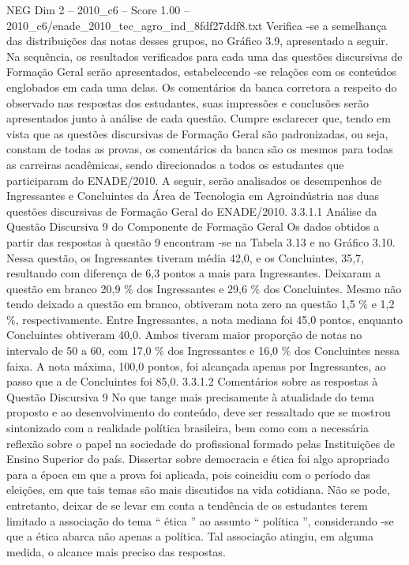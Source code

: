 \begin{textsample}{NEG Dim 2 – 2010\_c6 – Score 1.00 – 2010\_c6/enade\_2010\_tec\_agro\_ind\_8fdf27ddf8.txt}
Verifica -se a semelhança das distribuições das notas desses grupos, no Gráfico 3.9, apresentado a seguir.
Na sequência, os resultados verificados para cada uma das questões discursivas de Formação Geral serão apresentados, estabelecendo -se relações com os conteúdos englobados em cada uma delas.
Os comentários da banca corretora a respeito do observado nas respostas dos estudantes, suas impressões e conclusões serão apresentados junto à análise de cada questão.
Cumpre esclarecer que, tendo em vista que as questões discursivas de Formação Geral são padronizadas, ou seja, constam de todas as provas, os comentários da banca são os mesmos para todas as carreiras acadêmicas, sendo direcionados a todos os estudantes que participaram do ENADE/2010.
A seguir, serão analisados os desempenhos de Ingressantes e Concluintes da Área de Tecnologia em Agroindústria nas duas questões discursivas de Formação Geral do ENADE/2010. 3.3.1.1 Análise da Questão Discursiva 9 do Componente de Formação Geral Os dados obtidos a partir das respostas à questão 9 encontram -se na Tabela 3.13 e no Gráfico 3.10.
Nessa questão, os Ingressantes tiveram média 42,0, e os Concluintes, 35,7, resultando com diferença de 6,3 pontos a mais para Ingressantes.
Deixaram a questão em branco 20,9 \% dos Ingressantes e 29,6 \% dos Concluintes.
Mesmo não tendo deixado a questão em branco, obtiveram nota zero na questão 1,5 \% e 1,2 \%, respectivamente.
Entre Ingressantes, a nota mediana foi 45,0 pontos, enquanto Concluintes obtiveram 40,0.
Ambos tiveram maior proporção de notas no intervalo de 50 a 60, com 17,0 \% dos Ingressantes e 16,0 \% dos Concluintes nessa faixa.
A nota máxima, 100,0 pontos, foi alcançada apenas por Ingressantes, ao passo que a de Concluintes foi 85,0. 3.3.1.2 Comentários sobre as respostas à Questão Discursiva 9 No que tange mais precisamente à atualidade do tema proposto e ao desenvolvimento do conteúdo, deve ser ressaltado que se mostrou sintonizado com a realidade política brasileira, bem como com a necessária reflexão sobre o papel na sociedade do profissional formado pelas Instituições de Ensino Superior do país.
Dissertar sobre democracia e ética foi algo apropriado para a época em que a prova foi aplicada, pois coincidiu com o período das eleições, em que tais temas são mais discutidos na vida cotidiana.
Não se pode, entretanto, deixar de se levar em conta a tendência de os estudantes terem limitado a associação do tema “ ética ” ao assunto “ política ”, considerando -se que a ética abarca não apenas a política.
Tal associação atingiu, em alguma medida, o alcance mais preciso das respostas.

\end{textsample}
